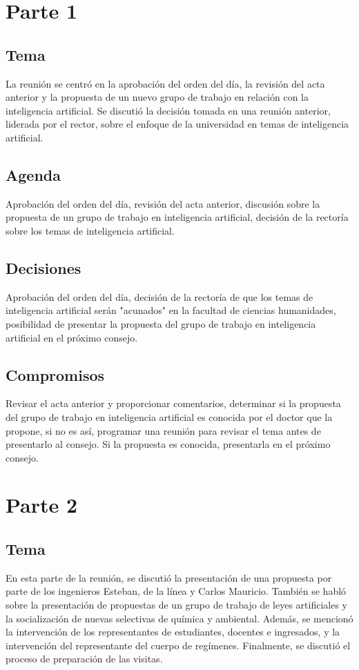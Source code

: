 \documentclass{article}
\begin{document}
\section{Parte 1}
\subsection{Tema}
La reunión se centró en la aprobación del orden del día, la revisión del acta anterior y la propuesta de un nuevo grupo de trabajo en relación con la inteligencia artificial. Se discutió la decisión tomada en una reunión anterior, liderada por el rector, sobre el enfoque de la universidad en temas de inteligencia artificial.

\subsection{Agenda}
Aprobación del orden del día, revisión del acta anterior, discusión sobre la propuesta de un grupo de trabajo en inteligencia artificial, decisión de la rectoría sobre los temas de inteligencia artificial.

\subsection{Decisiones}
Aprobación del orden del día, decisión de la rectoría de que los temas de inteligencia artificial serán "acunados" en la facultad de ciencias humanidades, posibilidad de presentar la propuesta del grupo de trabajo en inteligencia artificial en el próximo consejo.

\subsection{Compromisos}
Revisar el acta anterior y proporcionar comentarios, determinar si la propuesta del grupo de trabajo en inteligencia artificial es conocida por el doctor que la propone, si no es así, programar una reunión para revisar el tema antes de presentarlo al consejo. Si la propuesta es conocida, presentarla en el próximo consejo.
\section{Parte 2}
\subsection{Tema}
En esta parte de la reunión, se discutió la presentación de una propuesta por parte de los ingenieros Esteban, de la línea y Carlos Mauricio. También se habló sobre la presentación de propuestas de un grupo de trabajo de leyes artificiales y la socialización de nuevas selectivas de química y ambiental. Además, se mencionó la intervención de los representantes de estudiantes, docentes e ingresados, y la intervención del representante del cuerpo de regímenes. Finalmente, se discutió el proceso de preparación de las visitas.
\end{document}
